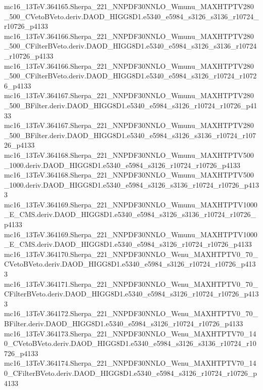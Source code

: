\begin{footnotesize}
mc16\_13TeV.364165.Sherpa\_221\_NNPDF30NNLO\_Wmunu\_MAXHTPTV280\_500\_CVetoBVeto.deriv.DAOD\_HIGG8D1.e5340\_e5984\_s3126\_s3136\_r10724\_r10726\_p4133 \\
mc16\_13TeV.364166.Sherpa\_221\_NNPDF30NNLO\_Wmunu\_MAXHTPTV280\_500\_CFilterBVeto.deriv.DAOD\_HIGG8D1.e5340\_e5984\_s3126\_s3136\_r10724\_r10726\_p4133 \\
mc16\_13TeV.364166.Sherpa\_221\_NNPDF30NNLO\_Wmunu\_MAXHTPTV280\_500\_CFilterBVeto.deriv.DAOD\_HIGG8D1.e5340\_e5984\_s3126\_r10724\_r10726\_p4133 \\
mc16\_13TeV.364167.Sherpa\_221\_NNPDF30NNLO\_Wmunu\_MAXHTPTV280\_500\_BFilter.deriv.DAOD\_HIGG8D1.e5340\_e5984\_s3126\_r10724\_r10726\_p4133 \\
mc16\_13TeV.364167.Sherpa\_221\_NNPDF30NNLO\_Wmunu\_MAXHTPTV280\_500\_BFilter.deriv.DAOD\_HIGG8D1.e5340\_e5984\_s3126\_s3136\_r10724\_r10726\_p4133 \\
mc16\_13TeV.364168.Sherpa\_221\_NNPDF30NNLO\_Wmunu\_MAXHTPTV500\_1000.deriv.DAOD\_HIGG8D1.e5340\_e5984\_s3126\_r10724\_r10726\_p4133 \\
mc16\_13TeV.364168.Sherpa\_221\_NNPDF30NNLO\_Wmunu\_MAXHTPTV500\_1000.deriv.DAOD\_HIGG8D1.e5340\_e5984\_s3126\_s3136\_r10724\_r10726\_p4133 \\
mc16\_13TeV.364169.Sherpa\_221\_NNPDF30NNLO\_Wmunu\_MAXHTPTV1000\_E\_CMS.deriv.DAOD\_HIGG8D1.e5340\_e5984\_s3126\_s3136\_r10724\_r10726\_p4133 \\
mc16\_13TeV.364169.Sherpa\_221\_NNPDF30NNLO\_Wmunu\_MAXHTPTV1000\_E\_CMS.deriv.DAOD\_HIGG8D1.e5340\_e5984\_s3126\_r10724\_r10726\_p4133 \\
mc16\_13TeV.364170.Sherpa\_221\_NNPDF30NNLO\_Wenu\_MAXHTPTV0\_70\_CVetoBVeto.deriv.DAOD\_HIGG8D1.e5340\_e5984\_s3126\_r10724\_r10726\_p4133 \\
mc16\_13TeV.364171.Sherpa\_221\_NNPDF30NNLO\_Wenu\_MAXHTPTV0\_70\_CFilterBVeto.deriv.DAOD\_HIGG8D1.e5340\_e5984\_s3126\_r10724\_r10726\_p4133 \\
mc16\_13TeV.364172.Sherpa\_221\_NNPDF30NNLO\_Wenu\_MAXHTPTV0\_70\_BFilter.deriv.DAOD\_HIGG8D1.e5340\_e5984\_s3126\_r10724\_r10726\_p4133 \\
mc16\_13TeV.364173.Sherpa\_221\_NNPDF30NNLO\_Wenu\_MAXHTPTV70\_140\_CVetoBVeto.deriv.DAOD\_HIGG8D1.e5340\_e5984\_s3126\_s3136\_r10724\_r10726\_p4133 \\
mc16\_13TeV.364174.Sherpa\_221\_NNPDF30NNLO\_Wenu\_MAXHTPTV70\_140\_CFilterBVeto.deriv.DAOD\_HIGG8D1.e5340\_e5984\_s3126\_r10724\_r10726\_p4133 \\

\end{footnotesize}
